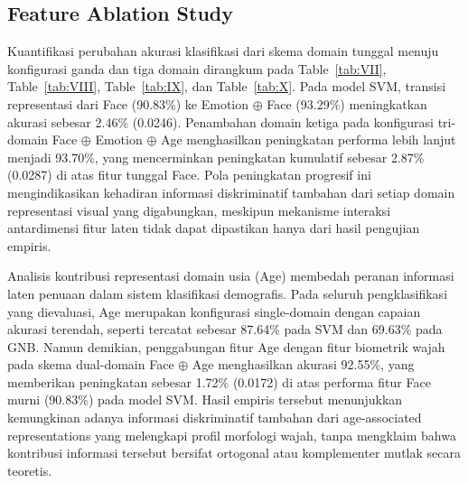 \subsection{Feature Ablation Study}
\label{sec:feature_ablation}

Kuantifikasi perubahan akurasi klasifikasi dari skema domain tunggal menuju konfigurasi ganda dan tiga domain dirangkum pada Table~\ref{tab:VII}, Table~\ref{tab:VIII}, Table~\ref{tab:IX}, dan Table~\ref{tab:X}. Pada model SVM, transisi representasi dari Face (90.83\%) ke Emotion $\oplus$ Face (93.29\%) meningkatkan akurasi sebesar 2.46\% (0.0246). Penambahan domain ketiga pada konfigurasi tri-domain Face $\oplus$ Emotion $\oplus$ Age menghasilkan peningkatan performa lebih lanjut menjadi 93.70\%, yang mencerminkan peningkatan kumulatif sebesar 2.87\% (0.0287) di atas fitur tunggal Face. Pola peningkatan progresif ini mengindikasikan kehadiran informasi diskriminatif tambahan dari setiap domain representasi visual yang digabungkan, meskipun mekanisme interaksi antardimensi fitur laten tidak dapat dipastikan hanya dari hasil pengujian empiris.

Analisis kontribusi representasi domain usia (Age) membedah peranan informasi laten penuaan dalam sistem klasifikasi demografis. Pada seluruh pengklasifikasi yang dievaluasi, Age merupakan konfigurasi single-domain dengan capaian akurasi terendah, seperti tercatat sebesar 87.64\% pada SVM dan 69.63\% pada GNB. Namun demikian, penggabungan fitur Age dengan fitur biometrik wajah pada skema dual-domain Face $\oplus$ Age menghasilkan akurasi 92.55\%, yang memberikan peningkatan sebesar 1.72\% (0.0172) di atas performa fitur Face murni (90.83\%) pada model SVM. Hasil empiris tersebut menunjukkan kemungkinan adanya informasi diskriminatif tambahan dari age-associated representations yang melengkapi profil morfologi wajah, tanpa mengklaim bahwa kontribusi informasi tersebut bersifat ortogonal atau komplementer mutlak secara teoretis.
